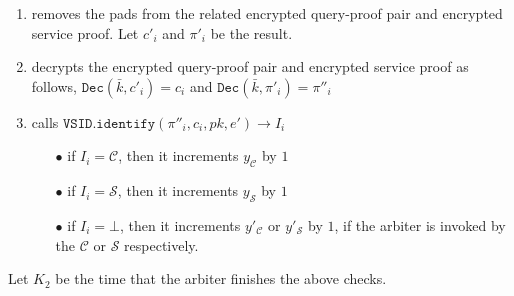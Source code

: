 \begin{enumerate}
\begin{enumerate}
\begin{enumerate}
\item removes the pads from the related encrypted    query-proof pair and encrypted service proof. Let $c'_{\scriptscriptstyle i}$ and $\pi'_{\scriptscriptstyle i}$ be the result. %
\item decrypts the encrypted query-proof pair and encrypted service proof as follows, $ \mathtt{Dec}(\bar{k},c'_{\scriptscriptstyle i})=c_{\scriptscriptstyle i}$ and 
$ \mathtt{Dec}(\bar{k},\pi'_{\scriptscriptstyle i})=\pi''_{\scriptscriptstyle i}$ 
\item\label{arbiter-identify} calls   $\mathtt{VSID.identify}(\pi''_{\scriptscriptstyle i},c_{\scriptscriptstyle i},pk,e')\rightarrow I_{\scriptscriptstyle i}$
\begin{enumerate}
\item[$\bullet$] if $I_{\scriptscriptstyle i}=\mathcal C$, then it increments $y_{\scriptscriptstyle\mathcal C}$ by $1$ 
\item[$\bullet$]  if $I_{\scriptscriptstyle i}=\mathcal S$, then it increments $y_{\scriptscriptstyle\mathcal S}$ by $1$ 
\item[$\bullet$]  if $I_{\scriptscriptstyle i}=\bot$, then it increments  $y'_{\scriptscriptstyle\mathcal C}$ or $y'_{\scriptscriptstyle\mathcal S}$ by $1$, if the arbiter is invoked by the $\mathcal {C}$ or $\mathcal {S}$ respectively. 
\end{enumerate}
\end{enumerate}

%
%
%
%
Let $K_{\scriptscriptstyle 2}$ be the time that the arbiter finishes the above checks.


\end{enumerate}
\end{enumerate}
